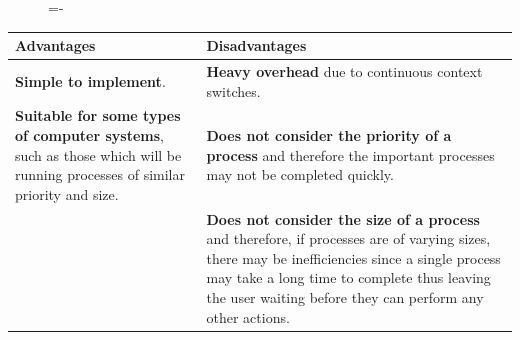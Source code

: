 \documentclass[a4paper]{systems-software}
\begin{document}
\begin{figure}[H]
  \lineskip=-\fboxrule
\end{figure}

\begin{longtabu} to \textwidth {|X[1,l]|X[1,l]|}
    \hline
    \textbf{Advantages} & \textbf{Disadvantages}
    \\ \hline
    \textbf{Simple to implement}.
    &
    \textbf{Heavy overhead} due to continuous context switches.
    \\ \hline
  	\textbf{Suitable for some types of computer systems}, such as those which will be running processes of similar priority and size.
    &
    \textbf{Does not consider the priority of a process} and therefore the important processes may not be completed quickly.
    \\ \hline
    &
    \textbf{Does not consider the size of a process} and therefore, if processes are of varying sizes, there may be inefficiencies since a single process may take a long time to complete thus leaving the user waiting before they can perform any other actions.
	\\ \hline
\end{longtabu}
\end{document}
